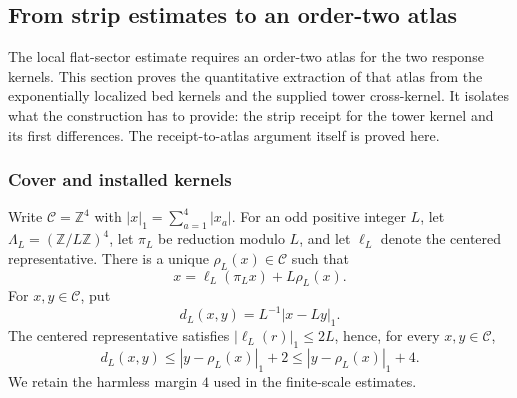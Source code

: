 \subsection{From strip estimates to an order-two atlas}
\label{sec:ex-lattice-atlas-estimates}

The local flat-sector estimate requires an order-two atlas for the two response
kernels. This section proves the quantitative extraction of that atlas from
the exponentially localized bed kernels and the supplied tower cross-kernel. It isolates
what the construction has to provide: the strip receipt for the tower kernel
and its first differences. The receipt-to-atlas argument itself is proved
here.

\subsubsection{Cover and installed kernels}

Write $\mathcal C=\mathbb Z^4$ with $|x|_1=\sum_{a=1}^4|x_a|$.
For an odd positive integer $L$, let $\Lambda_L=(\mathbb Z/L\mathbb Z)^4$,
let $\pi_L$ be reduction modulo $L$, and let $\ell_L$ denote the centered
representative. There is a unique $\rho_L(x)\in\mathcal C$ such that
\[
 x=\ell_L(\pi_Lx)+L\rho_L(x).
\]
For $x,y\in\mathcal C$, put
\[
 d_L(x,y)=L^{-1}|x-Ly|_1.
\]
The centered representative satisfies $|\ell_L(r)|_1\leq 2L$, hence, for
every $x,y\in\mathcal C$,
\begin{equation}
 d_L(x,y)\leq |y-\rho_L(x)|_1+2
 \leq |y-\rho_L(x)|_1+4.
 \label{eq:ex-lattice-atlas-mixed-distance}
\end{equation}
We retain the harmless margin $4$ used in the finite-scale estimates.

